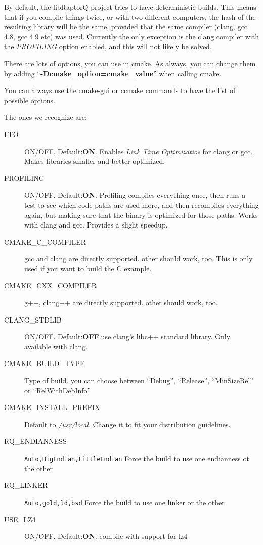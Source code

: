 \documentclass[11pt,a4paper]{refart}
\begin{document}
By default, the libRaptorQ project tries to have deterministic builds. This means that if you compile things twice, or with two different computers, the
hash of the resulting library will be the same, provided that the same compiler (clang, gcc 4.8, gcc 4.9 etc) was used. Currently the only exception is the clang
compiler with the \textit{PROFILING} option enabled, and this will not likely be solved.

There are lots of options, you can use in cmake. As always, you can change them by adding ``\textbf{-Dcmake\_option=cmake\_value}'' when calling cmake.

You can always use the cmake-gui or ccmake commands to have the list of possible options.

The ones we recognize are:

\begin{description}
\item[LTO] ON/OFF. Default:\textbf{ON}. Enables \textit{Link Time Optimizatios} for clang or gcc. Makes libraries smaller and better optimized.
\item[PROFILING] ON/OFF. Default:\textbf{ON}.
Profiling compiles everything once, then runs a test to see which code paths are used more, and then
recompiles everything again, but making sure that the binary is optimized for those paths. Works with clang and gcc. Provides a slight speedup.
\item[CMAKE\_C\_COMPILER] gcc and clang are directly supported. other should work, too. This is only used if you want to build the C example.
\item[CMAKE\_CXX\_COMPILER] g++, clang++ are directly supported. other should work, too.
\item[CLANG\_STDLIB] ON/OFF. Default:\textbf{OFF}.use clang's libc++ standard library. Only available with clang.
\item[CMAKE\_BUILD\_TYPE] Type of build. you can choose between ``Debug'', ``Release'', ``MinSizeRel'' or ``RelWithDebInfo''
\item[CMAKE\_INSTALL\_PREFIX] Default to \textit{/usr/local}. Change it to fit your distribution guidelines.
\item[RQ\_ENDIANNESS] \texttt{Auto,BigEndian,LittleEndian} Force the build to use one endianness ot the other
\item[RQ\_LINKER] \texttt{Auto,gold,ld,bsd} Force the build to use one linker or the other
\item[USE\_LZ4] ON/OFF. Default:\textbf{ON}. compile with support for lz4
\end{description}
\end{document}
